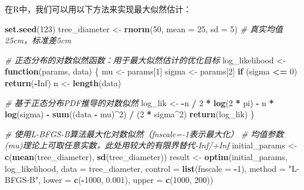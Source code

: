 \documentclass[
  twoside,12pt,fontset=none]{ctexbook}
\newenvironment{Shaded}{\begin{snugshade}}{\end{snugshade}}
\newcommand{\AttributeTok}[1]{\textcolor[rgb]{0.13,0.29,0.53}{#1}}
\newcommand{\CommentTok}[1]{\textcolor[rgb]{0.56,0.35,0.01}{\textit{#1}}}
\newcommand{\ConstantTok}[1]{\textcolor[rgb]{0.56,0.35,0.01}{#1}}
\newcommand{\ControlFlowTok}[1]{\textcolor[rgb]{0.13,0.29,0.53}{\textbf{#1}}}
\newcommand{\DecValTok}[1]{\textcolor[rgb]{0.00,0.00,0.81}{#1}}
\newcommand{\FloatTok}[1]{\textcolor[rgb]{0.00,0.00,0.81}{#1}}
\newcommand{\FunctionTok}[1]{\textcolor[rgb]{0.13,0.29,0.53}{\textbf{#1}}}
\newcommand{\NormalTok}[1]{#1}
\newcommand{\OtherTok}[1]{\textcolor[rgb]{0.56,0.35,0.01}{#1}}
\newcommand{\SpecialCharTok}[1]{\textcolor[rgb]{0.81,0.36,0.00}{\textbf{#1}}}
\newcommand{\StringTok}[1]{\textcolor[rgb]{0.31,0.60,0.02}{#1}}
\begin{document}
在R中，我们可以用以下方法来实现最大似然估计：

\begin{Shaded}
\begin{Highlighting}[]
\FunctionTok{set.seed}\NormalTok{(}\DecValTok{123}\NormalTok{)}
\NormalTok{tree\_diameter }\OtherTok{\textless{}{-}} \FunctionTok{rnorm}\NormalTok{(}\DecValTok{50}\NormalTok{, }\AttributeTok{mean =} \DecValTok{25}\NormalTok{, }\AttributeTok{sd =} \DecValTok{5}\NormalTok{)  }\CommentTok{\# 真实均值25cm，标准差5cm}

\CommentTok{\# 正态分布的对数似然函数：用于最大似然估计的优化目标}
\NormalTok{log\_likelihood }\OtherTok{\textless{}{-}} \ControlFlowTok{function}\NormalTok{(params, data) \{}
\NormalTok{  mu }\OtherTok{\textless{}{-}}\NormalTok{ params[}\DecValTok{1}\NormalTok{]}
\NormalTok{  sigma }\OtherTok{\textless{}{-}}\NormalTok{ params[}\DecValTok{2}\NormalTok{]}
  \ControlFlowTok{if}\NormalTok{ (sigma }\SpecialCharTok{\textless{}=} \DecValTok{0}\NormalTok{) }\FunctionTok{return}\NormalTok{(}\SpecialCharTok{{-}}\ConstantTok{Inf}\NormalTok{)}
\NormalTok{  n }\OtherTok{\textless{}{-}} \FunctionTok{length}\NormalTok{(data)}

  \CommentTok{\# 基于正态分布PDF推导的对数似然}
\NormalTok{  log\_lik }\OtherTok{\textless{}{-}} \SpecialCharTok{{-}}\NormalTok{n }\SpecialCharTok{/} \DecValTok{2} \SpecialCharTok{*} \FunctionTok{log}\NormalTok{(}\DecValTok{2} \SpecialCharTok{*}\NormalTok{ pi) }\SpecialCharTok{{-}}\NormalTok{ n }\SpecialCharTok{*} \FunctionTok{log}\NormalTok{(sigma) }\SpecialCharTok{{-}}
    \FunctionTok{sum}\NormalTok{((data }\SpecialCharTok{{-}}\NormalTok{ mu)}\SpecialCharTok{\^{}}\DecValTok{2}\NormalTok{) }\SpecialCharTok{/}\NormalTok{ (}\DecValTok{2} \SpecialCharTok{*}\NormalTok{ sigma}\SpecialCharTok{\^{}}\DecValTok{2}\NormalTok{)}
  \FunctionTok{return}\NormalTok{(log\_lik)}
\NormalTok{\}}

\CommentTok{\# 使用L{-}BFGS{-}B算法最大化对数似然（fnscale={-}1表示最大化）}
\CommentTok{\# 均值参数(mu)理论上可取任意实数，此处用较大的有限界替代{-}Inf/+Inf}
\NormalTok{initial\_params }\OtherTok{\textless{}{-}} \FunctionTok{c}\NormalTok{(}\FunctionTok{mean}\NormalTok{(tree\_diameter), }\FunctionTok{sd}\NormalTok{(tree\_diameter))}
\NormalTok{result }\OtherTok{\textless{}{-}} \FunctionTok{optim}\NormalTok{(initial\_params, log\_likelihood, }\AttributeTok{data =}\NormalTok{ tree\_diameter,}
                \AttributeTok{control =} \FunctionTok{list}\NormalTok{(}\AttributeTok{fnscale =} \SpecialCharTok{{-}}\DecValTok{1}\NormalTok{), }\AttributeTok{method =} \StringTok{"L{-}BFGS{-}B"}\NormalTok{,}
                \AttributeTok{lower =} \FunctionTok{c}\NormalTok{(}\SpecialCharTok{{-}}\DecValTok{1000}\NormalTok{, }\FloatTok{0.001}\NormalTok{), }\AttributeTok{upper =} \FunctionTok{c}\NormalTok{(}\DecValTok{1000}\NormalTok{, }\DecValTok{200}\NormalTok{))}


\end{Highlighting}
\end{Shaded}
\end{document}
